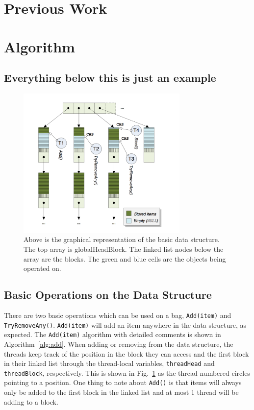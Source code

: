 \section{Previous Work}


\section{Algorithm}


\subsection{Everything below this is just an example}


\begin{figure}
\centering{}
\includegraphics[width=0.75\textwidth]{datastructure.png}
\caption{\label{fig:datastruct}Above is the graphical representation of the basic data structure. The top array is globalHeadBlock. The linked list nodes below the array are the blocks. The green and blue cells are the objects being operated on.}
\end{figure}

\subsection{Basic Operations on the Data Structure}

There are two basic operations which can be used on a bag, \texttt{Add(item)} and \texttt{TryRemoveAny()}.
\texttt{Add(item)} will add an item anywhere in the data structure, as expected.
The \texttt{Add(item)} algorithm with detailed comments is shown in Algorithm~\ref{alg:add}.
When adding or removing from the data structure, the threads keep track of the position in the block they can access
and the first block in their linked list through the thread-local variables, \texttt{threadHead}
and \texttt{threadBlock}, respectively. This is shown in Fig.~\ref{fig:datastruct} as the thread-numbered
circles pointing to a position. One thing to note about \texttt{Add()} is that items will always
only be added to the first block in the linked list and at most 1 thread will be adding to a block.

